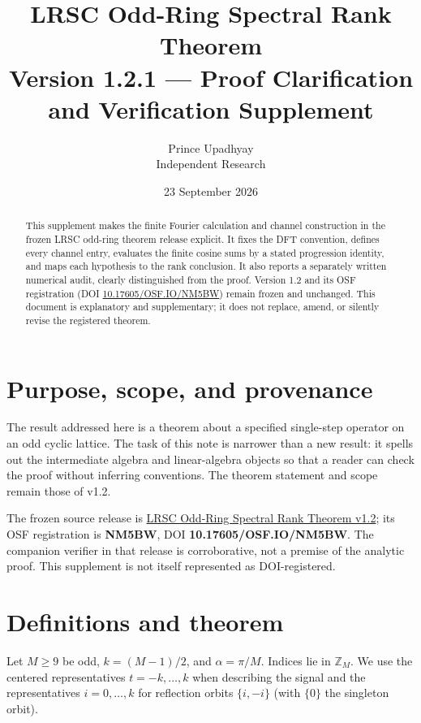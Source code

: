 \documentclass[11pt]{article}
\title{LRSC Odd-Ring Spectral Rank Theorem\\
\large Version 1.2.1 --- Proof Clarification and Verification Supplement}
\author{Prince Upadhyay\\Independent Research}
\date{23 September 2026}
\begin{document}
\maketitle

\begin{abstract}
This supplement makes the finite Fourier calculation and channel construction in the frozen LRSC odd-ring theorem release explicit. It fixes the DFT convention, defines every channel entry, evaluates the finite cosine sums by a stated progression identity, and maps each hypothesis to the rank conclusion. It also reports a separately written numerical audit, clearly distinguished from the proof. Version 1.2 and its OSF registration (DOI \href{https://doi.org/10.17605/OSF.IO/NM5BW}{10.17605/OSF.IO/NM5BW}) remain frozen and unchanged. This document is explanatory and supplementary; it does not replace, amend, or silently revise the registered theorem.
\end{abstract}

\section{Purpose, scope, and provenance}

The result addressed here is a theorem about a specified single-step operator on an odd cyclic lattice. The task of this note is narrower than a new result: it spells out the intermediate algebra and linear-algebra objects so that a reader can check the proof without inferring conventions. The theorem statement and scope remain those of v1.2.

The frozen source release is \href{https://github.com/reggaesharkk/Reggae-shark-universe-/tree/main/lrsc/odd-ring-rank-theorem/v1.2/}{LRSC Odd-Ring Spectral Rank Theorem v1.2}; its OSF registration is \textbf{NM5BW}, DOI \textbf{10.17605/OSF.IO/NM5BW}. The companion verifier in that release is corroborative, not a premise of the analytic proof. This supplement is not itself represented as DOI-registered.

\section{Definitions and theorem}

Let $M\geq 9$ be odd, $k=(M-1)/2$, and $\alpha=\pi/M$. Indices lie in $\mathbb Z_M$. We use the centered representatives $t=-k,\ldots,k$ when describing the signal and the representatives $i=0,\ldots,k$ for reflection orbits $\{i,-i\}$ (with $\{0\}$ the singleton orbit).
\end{document}
